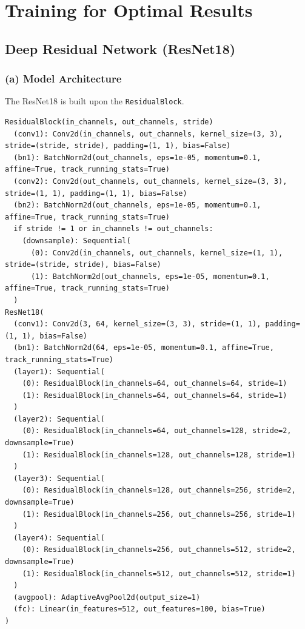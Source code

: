 \documentclass[12pt, a4paper]{article}
\begin{document}
\section{Training for Optimal Results}

\subsection*{Deep Residual Network (ResNet18)}

\subsubsection*{(a) Model Architecture}
The ResNet18 is built upon the \texttt{ResidualBlock}.

\begin{lstlisting}
ResidualBlock(in_channels, out_channels, stride)
  (conv1): Conv2d(in_channels, out_channels, kernel_size=(3, 3), stride=(stride, stride), padding=(1, 1), bias=False)
  (bn1): BatchNorm2d(out_channels, eps=1e-05, momentum=0.1, affine=True, track_running_stats=True)
  (conv2): Conv2d(out_channels, out_channels, kernel_size=(3, 3), stride=(1, 1), padding=(1, 1), bias=False)
  (bn2): BatchNorm2d(out_channels, eps=1e-05, momentum=0.1, affine=True, track_running_stats=True)
  if stride != 1 or in_channels != out_channels:
    (downsample): Sequential(
      (0): Conv2d(in_channels, out_channels, kernel_size=(1, 1), stride=(stride, stride), bias=False)
      (1): BatchNorm2d(out_channels, eps=1e-05, momentum=0.1, affine=True, track_running_stats=True)
  )
ResNet18(
  (conv1): Conv2d(3, 64, kernel_size=(3, 3), stride=(1, 1), padding=(1, 1), bias=False)
  (bn1): BatchNorm2d(64, eps=1e-05, momentum=0.1, affine=True, track_running_stats=True)
  (layer1): Sequential(
    (0): ResidualBlock(in_channels=64, out_channels=64, stride=1)
    (1): ResidualBlock(in_channels=64, out_channels=64, stride=1)
  )
  (layer2): Sequential(
    (0): ResidualBlock(in_channels=64, out_channels=128, stride=2, downsample=True)
    (1): ResidualBlock(in_channels=128, out_channels=128, stride=1)
  )
  (layer3): Sequential(
    (0): ResidualBlock(in_channels=128, out_channels=256, stride=2, downsample=True)
    (1): ResidualBlock(in_channels=256, out_channels=256, stride=1)
  )
  (layer4): Sequential(
    (0): ResidualBlock(in_channels=256, out_channels=512, stride=2, downsample=True)
    (1): ResidualBlock(in_channels=512, out_channels=512, stride=1)
  )
  (avgpool): AdaptiveAvgPool2d(output_size=1)
  (fc): Linear(in_features=512, out_features=100, bias=True)
)
\end{lstlisting}
\end{document}
